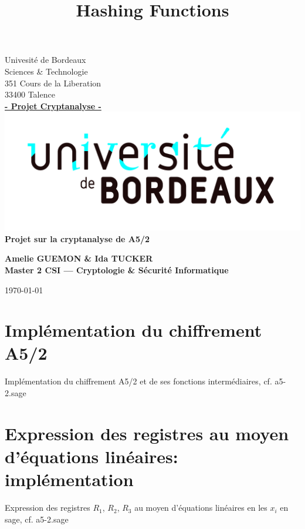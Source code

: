 \documentclass[a4paper]{article}
\title{Hashing Functions}
\author{}
\begin{document}
\begin{titlepage}
  \begin{sffamily}
    \begin{center}

      Univesité de Bordeaux\\ Sciences \& Technologie\\
      351 Cours de la Liberation\\33400 Talence\\[1em]
      \textbf{\underline{- Projet Cryptanalyse -}}\\[1.5cm]
      
      \includegraphics[scale=0.11]{UB.jpg}
      \\[3cm]
      
      { \huge \bfseries Projet sur la cryptanalyse de A5/2\\[0.5cm] }
      \begin{flushright}
        \bfseries {Amelie GUEMON \& Ida TUCKER\\[1em]Master 2 CSI --- Cryptologie \& Sécurité Informatique}\\[6.6cm]
      \end{flushright}
      
      
      \today

    \end{center}
  \end{sffamily}
\end{titlepage}

\section{Implémentation du chiffrement A5/2}
Implémentation du chiffrement A5/2 et de ses fonctions intermédiaires, cf. a5-2.sage



\section{Expression des registres au moyen d'équations linéaires: implémentation}
Expression des registres $R_1$, $R_2$, $R_3$ au moyen d'équations linéaires en les $x_i$ en sage, cf. a5-2.sage
\end{document}
